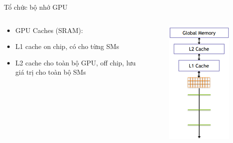 \documentclass[10pt]{beamer}
\theoremstyle{remark}
\numberwithin{algocf}{section}
\numberwithin{equation}{section}
\numberwithin{dl}{section}
\numberwithin{figure}{section}
\begin{document}
\begin{frame}{Tổ chức bộ nhớ GPU}
    \begin{columns}[onlytextwidth]
        \begin{column}{0.5\linewidth}
            \begin{itemize}
                \item GPU Caches (SRAM):
                \item L1 cache on chip, có cho từng SMs 
                \item L2 cache cho toàn bộ GPU, off chip, lưu giá trị cho toàn bộ SMs
            \end{itemize}
        \end{column}
        \begin{column}{0.5\linewidth}
            \begin{figure}[H]
                \centering
                \includegraphics[width=0.7\linewidth]{figures/CUDA/GPU_Caches_Memory.png}
            \end{figure}
        \end{column}
    \end{columns}
\end{frame}
\end{document}

